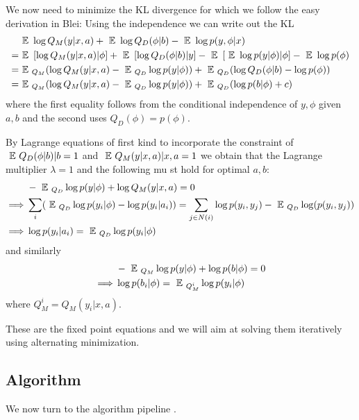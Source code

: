\documentclass{article} %
\begin{document}
We now need to minimize the KL divergence for which we follow the easy derivation in Blei:
Using the independence we can write out the KL 
\begin{align*}
&\mbox{ }\mathbb{E}\mbox{ } \log Q_M(y|x,a) + \mbox{ }\mathbb{E}\mbox{ } \log Q_D(\phi|b) - \mbox{ }\mathbb{E}\mbox{ } \log p(y,\phi|x)\\
 = &\mbox{ }\mathbb{E}\mbox{ } \left[\log Q_M(y|x,a)|\phi \right] + \mbox{ }\mathbb{E}\mbox{ } \left[ \log Q_D(\phi|b) |y\right] - \mbox{ }\mathbb{E}\mbox{ } \left[\mbox{ }\mathbb{E}\mbox{ } \log p(y|\phi) |\phi \right]- \mbox{ }\mathbb{E}\mbox{ } \log p(\phi)\\
= &\mbox{ }\mathbb{E}\mbox{ }_{Q_M} (\log Q_M(y|x,a) - \mbox{ }\mathbb{E}\mbox{ }_{Q_D} \log p(y|\phi)) + \mbox{ }\mathbb{E}\mbox{ }_{Q_D} (\log Q_D(\phi|b) - \log p(\phi))\\
= &\mbox{ }\mathbb{E}\mbox{ }_{Q_M} (\log Q_M(y|x,a) - \mbox{ }\mathbb{E}\mbox{ }_{Q_D} \log p(y|\phi)) + \mbox{ }\mathbb{E}\mbox{ }_{Q_D} (\log p(b|\phi) + c)
\end{align*}
where the first equality follows from the conditional independence of $y,\phi$ given $a,b$ and the second uses $Q_D(\phi) = p(\phi)$.

By Lagrange equations of first kind to incorporate the constraint of $\mbox{ }\mathbb{E}\mbox{ } Q_D(\phi|b) |b = 1$ and $\mbox{ }\mathbb{E}\mbox{ } Q_M(y|x,a) |x,a = 1$  we obtain that the Lagrange multiplier $\lambda = 1$ and the following mu
st hold for optimal $a,b$:
\begin{align*}
& -\mbox{ }\mathbb{E}\mbox{ }_{Q_D} \log p(y|\phi) + \log Q_M(y|x,a) = 0\\
\implies  &\sum_i (\mbox{ }\mathbb{E}\mbox{ }_{Q_D}\log p(y_i|\phi) - \log p(y_i|a_i)) = \sum_{j\in N(i)} \log p(y_i,y_j) - \mbox{ }\mathbb{E}\mbox{ }_{Q_D} \log(p(y_i,y_j)) \\
\implies &\log p(y_i|a_i) = \mbox{ }\mathbb{E}\mbox{ }_{Q_D} \log p(y_i|\phi) 
\end{align*}
and similarly
\begin{align*}
&- \mbox{ }\mathbb{E}\mbox{ }_{Q_M} \log p(y|\phi) + \log p(b|\phi) = 0\\
\implies &\log p(b_i|\phi) = \mbox{ }\mathbb{E}\mbox{ }_{Q^i_M} \log p(y_i|\phi)  
\end{align*}
where $Q_M^i = Q_M(y_i|x,a)$.

These are the fixed point equations and we will aim at solving them iteratively using alternating minimization. 

\subsection{Algorithm}

We now turn to the algorithm pipeline
. 
\end{document}
